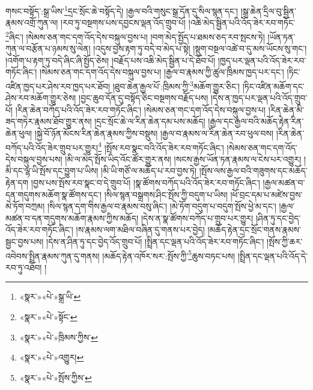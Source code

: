 གསང་བསྟོད་:སྒྲ་ཡིས་\footnote{«སྣར་»«པེ་»སྒྲ་ཡི་}དྲང་སྲོང་ཆེ་བསྟོད་དེ། །རྒྱལ་བའི་གསུང་སྒྲ་དོན་དུ་སིལ་སྙན་དང་། །སྒྲ་ཆེན་དྲིལ་བུ་སྦྱིན་རྣམས་འགྲོ་ཀུན་ལ། །རབ་ཏུ་བསྔགས་པས་དབྱངས་ལྡན་འོད་གྲུབ་པོ། །འཆི་མེད་སྦྱིན་པའི་འོད་ཟེར་རབ་གཏོང་\footnote{«སྣར་»«པེ་»སྟོང་}ཞིང་། །སེམས་ཅན་གང་དག་འོད་དེས་བསྐུལ་བྱས་པ། །བག་མེད་སྤྱོད་པ་ཐམས་ཅད་རབ་སྤངས་ཏེ། །ཡོན་ཏན་ཀུན་ལ་བརྩོན་པ་ཉམས་སུ་ལེན། །འདུས་བྱས་རྟག་ཏུ་བདེ་བ་མེད་པ་སྟེ། །སྡུག་བསྔལ་འཚེ་བ་དུ་མས་ཡོངས་སུ་གང་། །འགོག་པ་རྟག་ཏུ་བདེ་ཞིང་ཞི་སྤྱོད་ཅེས། །བརྗོད་པས་འཆི་མེད་སྦྱིན་པ་དེ་ཐོབ་པོ། །ཁྱད་པར་ལྡན་པའི་འོད་ཟེར་རབ་གཏོང་ཞིང་། །སེམས་ཅན་གང་དག་འོད་དེས་བསྐུལ་བྱས་པ། །རྒྱལ་བ་རྣམས་ཀྱི་ཚུལ་ཁྲིམས་ཁྱད་པར་དང་། །ཏིང་འཛིན་ཁྱད་པར་ཤེས་རབ་ཁྱད་པར་ཐོབ། །ཐུབ་ཆེན་རྒྱལ་པོ་:ཁྲིམས་ཀྱི་\footnote{«སྣར་»«པེ་»ཁྲིམས་ཀྱིས་}མཆོག་གྱུར་ཅིང་། །ཏིང་འཛིན་མཆོག་དང་ཤེས་རབ་མཆོག་གྱུར་ཅེས། །བྱང་ཆུབ་དོན་དུ་བསྟོད་ཅིང་བསྔགས་བརྗོད་པས། །དེས་ན་ཁྱད་པར་ལྡན་པའི་འོད་གྲུབ་པོ། །རིན་ཆེན་བཀོད་པའི་འོད་ཟེར་རབ་གཏོང་ཞིང་། །སེམས་ཅན་གང་དག་འོད་དེས་བསྐུལ་བྱས་པ། །རིན་ཆེན་མི་ཟད་གཏེར་རྣམས་ཐོབ་གྱུར་ནས། །དྲང་སྲོང་ཆེ་ལ་རིན་ཆེན་དམ་པས་མཆོད། །རྒྱལ་དང་རྒྱལ་བའི་མཆོད་རྟེན་རིན་ཆེན་ཕུལ། །སྐྱེ་བོ་ཉོན་མོངས་རིན་ཆེན་རྣམས་ཀྱིས་བསྡུས། །རྒྱལ་བ་རྣམས་ལ་རིན་ཆེན་རབ་ཕུལ་བས། །རིན་ཆེན་བཀོད་པའི་འོད་ཟེར་གྲུབ་པར་གྱུར།\footnote{«སྣར་»«པེ་»འགྱུར།} །སྤོས་རབ་སྣང་བའི་འོད་ཟེར་རབ་གཏོང་ཞིང་། །སེམས་ཅན་གང་དག་འོད་དེས་བསྐུལ་བྱས་པས། །མི་ལ་མེད་སྤོས་ཡིད་འོང་ཚོར་གྱུར་ནས། །སངས་རྒྱས་ཡོན་ཏན་རྣམས་ལ་ངེས་པར་འགྱུར། །མི་དང་ལྷ་ཡི་སྤོས་དང་བྱུག་པ་ཡིས། །མི་ཡི་གཙོ་ལ་མཆོད་པ་རབ་བྱས་ཏེ། །སྤོས་ལས་རྒྱལ་བའི་གཟུགས་དང་མཆོད་རྟེན་དག །བྱས་པས་སྤོས་རབ་སྣང་བ་དེ་གྲུབ་པོ། །སྣ་ཚོགས་བཀོད་པའི་འོད་ཟེར་རབ་གཏོང་ཞིང་། །རྒྱལ་མཚན་བ་དན་གདུགས་མཆོག་སྣ་ཚོགས་དང་། །སིལ་སྙན་བསྒྲགས་ཤིང་སྤོས་ཀྱི་བདུག་པ་ཡིས། །ཕོ་བྲང་དམ་པ་མཛེས་བྱས་མེ་ཏོག་བཀྲམ། །སིལ་སྙན་དག་གིས་རྒྱལ་བ་རྣམས་བསུ་ཞིང་། །མེ་ཏོག་བདུག་པ་བདུག་སྤོས་ཕྱེ་མ་དང་། །རྒྱལ་མཚན་བ་དན་གདུགས་མཆོག་རྣམས་ཀྱིས་མཆོད། །དེས་ན་སྣ་ཚོགས་བཀོད་པ་གྲུབ་པར་གྱུར། །ཤིན་ཏུ་དང་བྱེད་འོད་ཟེར་རབ་གཏོང་ཞིང་། །ས་རྣམས་ལག་མཐིལ་བཞིན་དུ་གནས་པར་བྱེད། །མཆོད་རྟེན་དྲང་སྲོང་གནས་རྣམས་སྦྱང་བྱས་པས། །དེས་ན་ཤིན་ཏུ་དང་བྱེད་འོད་གྲུབ་པོ། །སྤྲིན་དང་ལྡན་པའི་འོད་ཟེར་རབ་གཏོང་ཞིང་། །སྤོས་ཀྱི་ཆར་འབེབས་སྤྲིན་རྣམས་ཀུན་དུ་གནས། །མཆོད་རྟེན་འཁོར་སར་:སྤོས་ཀྱི་\footnote{«སྣར་»«པེ་»སྤོས་ཀྱིས་}ཆུས་བཏང་པས། །སྤྲིན་དང་ལྡན་པའི་འོད་དེ་རབ་ཏུ་འཐོབ། །

